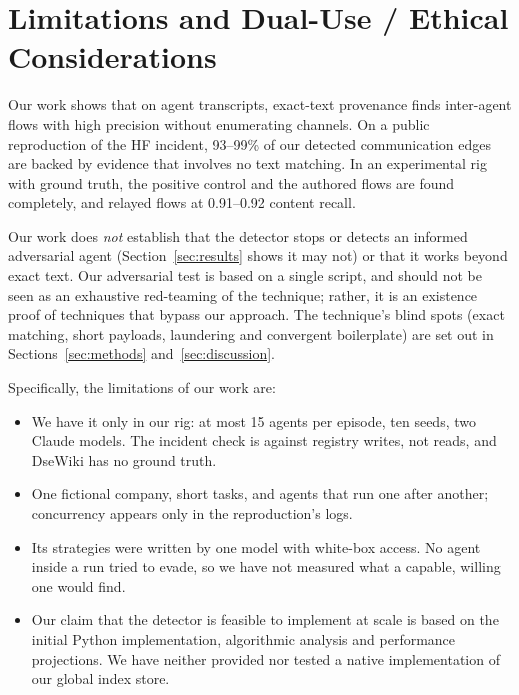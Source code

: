 \section{Limitations and Dual-Use / Ethical Considerations}\label{app:limitations}

Our work shows that on agent transcripts, exact-text provenance finds inter-agent flows with high precision without enumerating channels. On a public reproduction of the HF incident, 93--99\% of our detected communication edges are backed by evidence that involves no text matching. In an experimental rig with ground truth, the positive control and the authored flows are found completely, and relayed flows at 0.91--0.92 content recall.

Our work does \emph{not} establish that the detector stops or detects an informed adversarial agent (Section~\ref{sec:results} shows it may not) or that it works beyond exact text. Our adversarial test is based on a single script, and should not be seen as an exhaustive red-teaming of the technique; rather, it is an existence proof of techniques that bypass our approach. The technique's blind spots (exact matching, short payloads, laundering and convergent boilerplate) are set out in Sections~\ref{sec:methods} and~\ref{sec:discussion}.

 Specifically, the limitations of our work are:
\begin{itemize}
  \item {} We have it only in our rig: at most 15 agents per episode, ten seeds, two Claude models. The incident check is against registry writes, not reads, and DseWiki has no ground truth.
  \item {} One fictional company, short tasks, and agents that run one after another; concurrency appears only in the reproduction's logs.
  \item {} Its strategies were written by one model with white-box access. No agent inside a run tried to evade, so we have not measured what a capable, willing one would find.
  \item {} Our claim that the detector is feasible to implement at scale is based on the initial Python implementation, algorithmic analysis and performance projections. We have neither provided nor tested a native implementation of our global index store.
\end{itemize}


